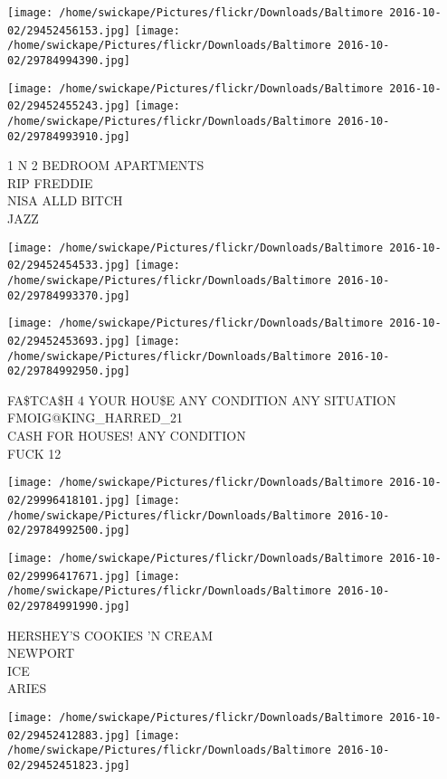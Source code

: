 \documentclass[10pt,letterpaper]{article}
\begin{document}
\texttt{[image: /home/swickape/Pictures/flickr/Downloads/Baltimore 2016-10-02/29452456153.jpg]}
\texttt{[image: /home/swickape/Pictures/flickr/Downloads/Baltimore 2016-10-02/29784994390.jpg]}

\texttt{[image: /home/swickape/Pictures/flickr/Downloads/Baltimore 2016-10-02/29452455243.jpg]}
\texttt{[image: /home/swickape/Pictures/flickr/Downloads/Baltimore 2016-10-02/29784993910.jpg]}

1 N 2 BEDROOM APARTMENTS\\
RIP FREDDIE\\
NISA ALLD BITCH\\
JAZZ
\pagebreak

\texttt{[image: /home/swickape/Pictures/flickr/Downloads/Baltimore 2016-10-02/29452454533.jpg]}
\texttt{[image: /home/swickape/Pictures/flickr/Downloads/Baltimore 2016-10-02/29784993370.jpg]}

\texttt{[image: /home/swickape/Pictures/flickr/Downloads/Baltimore 2016-10-02/29452453693.jpg]}
\texttt{[image: /home/swickape/Pictures/flickr/Downloads/Baltimore 2016-10-02/29784992950.jpg]}

FA\$TCA\$H 4 YOUR HOU\$E ANY CONDITION ANY SITUATION\\
FMOIG@KING\_HARRED\_21\\
CASH FOR HOUSES!  ANY CONDITION\\
FUCK 12
\pagebreak

\texttt{[image: /home/swickape/Pictures/flickr/Downloads/Baltimore 2016-10-02/29996418101.jpg]}
\texttt{[image: /home/swickape/Pictures/flickr/Downloads/Baltimore 2016-10-02/29784992500.jpg]}

\texttt{[image: /home/swickape/Pictures/flickr/Downloads/Baltimore 2016-10-02/29996417671.jpg]}
\texttt{[image: /home/swickape/Pictures/flickr/Downloads/Baltimore 2016-10-02/29784991990.jpg]}

HERSHEY'S COOKIES 'N CREAM\\
NEWPORT\\
ICE\\
ARIES
\pagebreak

\texttt{[image: /home/swickape/Pictures/flickr/Downloads/Baltimore 2016-10-02/29452412883.jpg]}
\texttt{[image: /home/swickape/Pictures/flickr/Downloads/Baltimore 2016-10-02/29452451823.jpg]}
\end{document}
